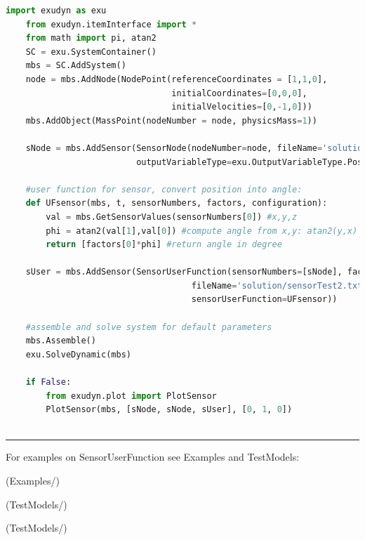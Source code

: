     \begin{lstlisting}[language=Python]
    import exudyn as exu
    from exudyn.itemInterface import *
    from math import pi, atan2
    SC = exu.SystemContainer()
    mbs = SC.AddSystem()
    node = mbs.AddNode(NodePoint(referenceCoordinates = [1,1,0], 
                                 initialCoordinates=[0,0,0],
                                 initialVelocities=[0,-1,0]))
    mbs.AddObject(MassPoint(nodeNumber = node, physicsMass=1))
    
    sNode = mbs.AddSensor(SensorNode(nodeNumber=node, fileName='solution/sensorTest.txt',
                          outputVariableType=exu.OutputVariableType.Position))

    #user function for sensor, convert position into angle:
    def UFsensor(mbs, t, sensorNumbers, factors, configuration):
        val = mbs.GetSensorValues(sensorNumbers[0]) #x,y,z
        phi = atan2(val[1],val[0]) #compute angle from x,y: atan2(y,x)
        return [factors[0]*phi] #return angle in degree
    
    sUser = mbs.AddSensor(SensorUserFunction(sensorNumbers=[sNode], factors=[180/pi], 
                                     fileName='solution/sensorTest2.txt',
                                     sensorUserFunction=UFsensor))

    #assemble and solve system for default parameters
    mbs.Assemble()
    exu.SolveDynamic(mbs)

    if False:
        from exudyn.plot import PlotSensor
        PlotSensor(mbs, [sNode, sNode, sUser], [0, 1, 0])
    
    \end{lstlisting}
\vspace{6pt}\par\noindent\rule{\textwidth}{0.4pt}
%
\noindent For examples on SensorUserFunction see Examples and TestModels:
\bi
\item {} (Examples/)
\item {} (TestModels/)
\item {} (TestModels/)
\ei

%
